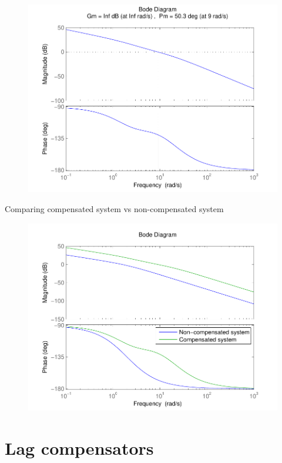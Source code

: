 \begin{frame}
\begin{figure}
	\centering
	\includegraphics[width=0.7
	\linewidth]{leadstep7better}
\end{figure}
\end{frame}

\begin{frame}
	\begin{exampleblock}{Comparing compensated system vs non-compensated system}
	\begin{figure}
		\centering
		\includegraphics[width=0.7
		\linewidth]{leadcomparingbetter}
	\end{figure}
	\end{exampleblock}
\end{frame}

\section{Lag compensators}

